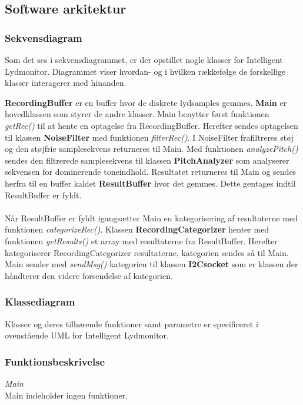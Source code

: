\newpage
\subsection{Software arkitektur}
\subsubsection*{Sekvensdiagram}

Som det ses i sekvensdiagrammet, er der opstillet nogle klasser for Intelligent Lydmonitor. Diagrammet viser hvordan- og i hvilken rækkefølge de forskellige klasser interagerer med hinanden. 

\textbf{RecordingBuffer} er en buffer hvor de diskrete lydsamples gemmes.
\textbf{Main} er hovedklassen som styrer de andre klasser. Main benytter først funktionen \textit{getRec()} til at hente en optagelse fra RecordingBuffer. Herefter sendes optagelsen til klassen \textbf{NoiseFilter} med funktionen \textit{filterRec()}. I NoiseFilter frafiltreres støj og den støjfrie samplesekvens returneres til Main. Med funktionen \textit{analyzePitch()} sendes den filtrerede samplesekvens til klassen \textbf{PitchAnalyzer} som analyserer sekvensen for dominerende toneindhold. Resultatet returneres til Main og sendes herfra til en buffer kaldet \textbf{ResultBuffer} hvor det gemmes. Dette gentages indtil ResultBuffer er fyldt. \\ \\
Når ResultBuffer er fyldt igangsætter Main en kategorisering af resultaterne med funktionen \textit{categorizeRec()}. Klassen \textbf{RecordingCategorizer} henter med funktionen \textit{getResults()} et array med resultaterne fra ResultBuffer. Herefter kategoriserer RecordingCategorizer resultaterne, kategorien sendes så til Main. Main sender med \textit{sendMsg()} kategorien til klassen \textbf{I2Csocket} som er klassen der håndterer den videre forsendelse af kategorien. 

\subsubsection*{Klassediagram}
Klasser og deres tilhørende funktioner samt parametre er specificeret i ovenstående UML for Intelligent Lydmonitor. 

\subsubsection*{Funktionsbeskrivelse}
\textit{Main} \\
Main indeholder ingen funktioner.


